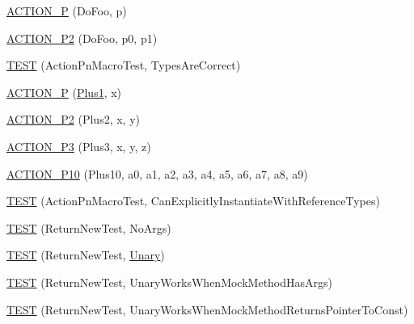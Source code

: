 \begin{DoxyCompactItemize}
\hyperlink{namespacetesting_1_1gmock__generated__actions__test_a8487a3396f4f705e134e44584634ef1c}{A\+C\+T\+I\+O\+N\+\_\+P} (Do\+Foo, p)
\item 
\hyperlink{namespacetesting_1_1gmock__generated__actions__test_acd38e742235e154ad309f22e9a470a86}{A\+C\+T\+I\+O\+N\+\_\+\+P2} (Do\+Foo, p0, p1)
\item 
\hyperlink{namespacetesting_1_1gmock__generated__actions__test_ad702feced8b71b3708782b1a2274453e}{T\+E\+ST} (Action\+Pn\+Macro\+Test, Types\+Are\+Correct)
\item 
\hyperlink{namespacetesting_1_1gmock__generated__actions__test_a89c01b82e854ad79e3d139aa72477747}{A\+C\+T\+I\+O\+N\+\_\+P} (\hyperlink{namespacetesting_1_1gmock__generated__actions__test_a75e901c6d28c591c53a54320a294da55}{Plus1}, x)
\item 
\hyperlink{namespacetesting_1_1gmock__generated__actions__test_a0e2768c0fae30bc46ec6e322b29dd54c}{A\+C\+T\+I\+O\+N\+\_\+\+P2} (Plus2, x, y)
\item 
\hyperlink{namespacetesting_1_1gmock__generated__actions__test_afc911947c840aa9857eb2d06e4d80787}{A\+C\+T\+I\+O\+N\+\_\+\+P3} (Plus3, x, y, z)
\item 
\hyperlink{namespacetesting_1_1gmock__generated__actions__test_a4e48e01a7bfc369d279cc0c99a7d3c60}{A\+C\+T\+I\+O\+N\+\_\+\+P10} (Plus10, a0, a1, a2, a3, a4, a5, a6, a7, a8, a9)
\item 
\hyperlink{namespacetesting_1_1gmock__generated__actions__test_a20664d32f08c53d6f9fa5e020a85fab3}{T\+E\+ST} (Action\+Pn\+Macro\+Test, Can\+Explicitly\+Instantiate\+With\+Reference\+Types)
\item 
\hyperlink{namespacetesting_1_1gmock__generated__actions__test_a058a3d17071ddb888319ab71b491af94}{T\+E\+ST} (Return\+New\+Test, No\+Args)
\item 
\hyperlink{namespacetesting_1_1gmock__generated__actions__test_a64f3f8327d51c139b441846e809ae4bc}{T\+E\+ST} (Return\+New\+Test, \hyperlink{namespacetesting_1_1gmock__generated__actions__test_a61f0e6c3f2c07079299f1d6e1667ab92}{Unary})
\item 
\hyperlink{namespacetesting_1_1gmock__generated__actions__test_ad8f696b14b0f2dba4986c53f615aef15}{T\+E\+ST} (Return\+New\+Test, Unary\+Works\+When\+Mock\+Method\+Has\+Args)
\item 
\hyperlink{namespacetesting_1_1gmock__generated__actions__test_ad9f45ddc4a5616b919116c766ad37a30}{T\+E\+ST} (Return\+New\+Test, Unary\+Works\+When\+Mock\+Method\+Returns\+Pointer\+To\+Const)
\item 

\end{DoxyCompactItemize}
